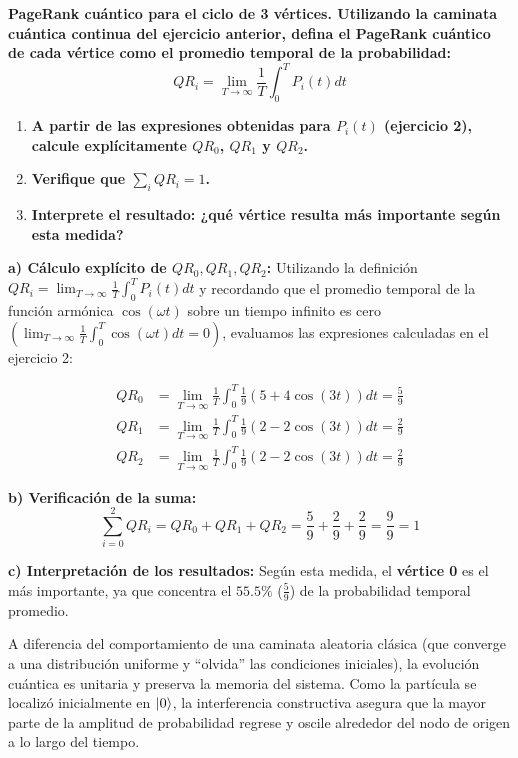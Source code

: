 {\bfseries PageRank cuántico para el ciclo de 3 vértices. 
Utilizando la caminata cuántica continua del ejercicio anterior, defina el PageRank cuántico de cada vértice como el promedio temporal de la probabilidad: 
\begin{equation*}
QR_{i}=\lim_{T\rightarrow\infty}\frac{1}{T}\int_{0}^{T}P_{i}(t)dt
\end{equation*}}

\begin{enumerate}
    \item[a)] {\bfseries A partir de las expresiones obtenidas para $P_{i}(t)$ (ejercicio 2), calcule explícitamente $QR_{0}$, $QR_{1}$ y $QR_{2}$.}
    \item[b)] {\bfseries Verifique que $\sum_{i}QR_{i}=1$.}
    \item[c)] {\bfseries Interprete el resultado: ¿qué vértice resulta más importante según esta medida?}
\end{enumerate}

\textbf{a) Cálculo explícito de $QR_0, QR_1, QR_2$:}
Utilizando la definición $QR_i = \lim_{T \to \infty} \frac{1}{T} \int_0^T P_i(t) dt$ y recordando que el promedio temporal de la función armónica $\cos(\omega t)$ sobre un tiempo infinito es cero $\left(\lim_{T \to \infty} \frac{1}{T} \int_0^T \cos(\omega t) dt = 0\right)$, evaluamos las expresiones calculadas en el ejercicio 2:

\begin{align*}
QR_0 &= \lim_{T \to \infty} \frac{1}{T} \int_0^T \frac{1}{9}(5 + 4\cos(3t)) dt = \frac{5}{9} \\
QR_1 &= \lim_{T \to \infty} \frac{1}{T} \int_0^T \frac{1}{9}(2 - 2\cos(3t)) dt = \frac{2}{9} \\
QR_2 &= \lim_{T \to \infty} \frac{1}{T} \int_0^T \frac{1}{9}(2 - 2\cos(3t)) dt = \frac{2}{9}
\end{align*}

\vspace{0.5cm}
\textbf{b) Verificación de la suma:}
\begin{equation*}
\sum_{i=0}^2 QR_i = QR_0 + QR_1 + QR_2 = \frac{5}{9} + \frac{2}{9} + \frac{2}{9} = \frac{9}{9} = 1
\end{equation*}

\vspace{0.5cm}
\textbf{c) Interpretación de los resultados:}
Según esta medida, el \textbf{vértice 0} es el más importante, ya que concentra el $55.5\%$ ($\frac{5}{9}$) de la probabilidad temporal promedio. 

A diferencia del comportamiento de una caminata aleatoria clásica (que converge a una distribución
uniforme y ``olvida'' las condiciones iniciales), la evolución cuántica es unitaria y preserva la memoria del sistema. Como la partícula se localizó inicialmente en $\ket{0}$, la interferencia constructiva asegura que la mayor parte de la amplitud de probabilidad regrese y oscile alrededor del nodo de origen a lo largo del tiempo.
